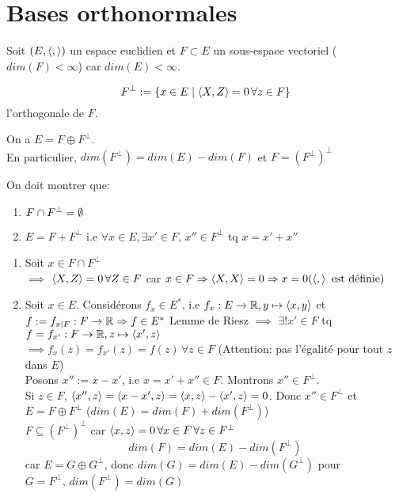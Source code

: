 \section{Bases orthonormales}
Soit $(E, \left\langle , \right\rangle)$ un espace euclidien et  $F \subset E$ un sous-espace vectoriel ($dim(F) < \infty$) car $dim(E) < \infty$.
\begin{note}
    \[
        F^{\perp} := \{x \in E \mid \left\langle X, Z \right\rangle = 0 \, \forall z \in F\} 
    \] 
    l'orthogonale de $F$.
\end{note}
\begin{theorem}
    On a $E = F \oplus F^{\perp}$.\\
    En particulier,  $dim(F^{\perp}) = dim(E) - dim(F)$ et  $F = (F^{\perp})^{\perp}$
\end{theorem}
\begin{preuve}
   On doit montrer que:
   \begin{enumerate}
       \item $F \cap F^{\perp} = \emptyset$
       \item $E = F + F^{\perp}$ i.e  $\forall x \in E, \exists x' \in F, \, x'' \in F^{\perp}$ tq $x = x' + x''$ 
   \end{enumerate}
   \begin{enumerate}
       \item Soit $x \in F \cap F^{\perp}$\\
       $\implies$ $\left\langle X, Z \right\rangle = 0 \, \forall Z \in F$ car $x \in F \Rightarrow \left\langle X, X \right\rangle = 0 \Rightarrow x = 0 (\left\langle , \right\rangle \text{ est définie})$ 
        \item Soit $x \in E$. Considérons  $f_x \in E^{*}$, i.e  $f_x: E \to \mathbb{R}, y \mapsto \left\langle x, y \right\rangle$ et $f := f_{x|F}: F \to \mathbb{R} \Rightarrow f \in E^{*}$
            Lemme de Riesz $\implies$ $\exists! x' \in F$ tq $f = f_{x'}: F \to \mathbb{R}, z \mapsto \left\langle x', z \right\rangle$\\
            $\implies f_{x}(z) = f_{x'}(z) = f(z)\, \forall z \in F$ (Attention: pas l'égalité pour tout $z$ dans  $E$)\\
            Posons $x'' := x - x'$, i.e  $x = x' + x'' \in F$. Montrons  $x'' \in  F^{\perp}$.\\
            Si $z \in F$,  $\left\langle x'', z \right\rangle = \left\langle x - x', z \right\rangle = \left\langle x, z \right\rangle - \left\langle x', z \right\rangle = 0$. Donc $x'' \in F^{\perp}$ et  $E = F \oplus F^{\perp}$ ($dim(E) = dim(F) + dim(F^{\perp})$) \\
            $F \subseteq (F^{\perp})^{\perp}$ car $\left\langle x, z \right\rangle = 0 \, \forall x \in F \, \forall z \in F^{\perp}$
            \[
                dim(F) = dim(E) - dim(F^{\perp})
            \] 
            car $E = G \oplus G^{\perp}$, donc  $dim(G) = dim(E) - dim(G^{\perp})$ pour  $G = F^{\perp}, \, dim(F^{\perp}) = dim(G)$
   \end{enumerate}
\end{preuve}
